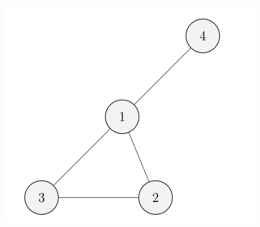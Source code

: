 \begin{frame}[allowframebreaks]
\begin{itemize}
  \end{itemize}
\includegraphics[scale=0.3]{figur/noter38.png}
\end{frame}

